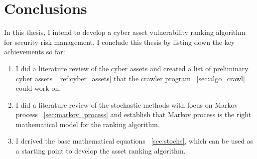 \section{Conclusions}\label{sec:conclusions}
In this thesis, I intend to develop a cyber asset vulnerability ranking algorithm for security risk management.  I conclude this thesis by listing down the key achievements so far:
\begin{enumerate}
        \item I did a literature review of the cyber assets and created a list of preliminary cyber assets ~\ref{ref:cyber_assets} that the crawler program ~\ref{sec:algo_crawl} could work on.
        \item I did a literature review of the stochastic methods with focus on Markov process ~\ref{sec:markov_process} and establish that Markov process is the right mathematical model for the ranking algorithm.
        \item I derived the base mathematical equations ~\ref{sec:stochs}, which can be used as a starting point to develop the asset ranking algorithm.
\end{enumerate}

